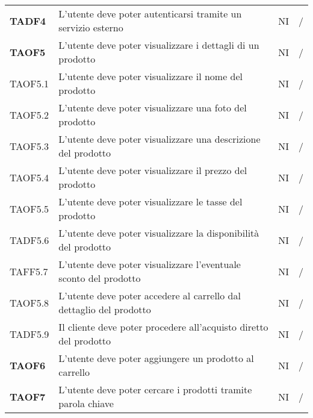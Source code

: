 \begin{center}
\begin{longtable}[!h]{p{60px} p{240px} p{35px} p{35px}}
        \textbf{TADF4}  & L'utente deve poter autenticarsi tramite un servizio esterno                                        & NI             & /              \\
        \textbf{TAOF5}  & L'utente deve poter visualizzare i dettagli di un prodotto                                          & NI             & /              \\
        TAOF5.1         & L'utente deve poter visualizzare il nome del prodotto                                               & NI             & /              \\
        TAOF5.2         & L'utente deve poter visualizzare una foto del prodotto                                              & NI             & /              \\
        TAOF5.3         & L'utente deve poter visualizzare una descrizione del prodotto                                       & NI             & /              \\
        TAOF5.4         & L'utente deve poter visualizzare il prezzo del prodotto                                             & NI             & /              \\
        TAOF5.5         & L'utente deve poter visualizzare le tasse del prodotto                                              & NI             & /              \\
        TADF5.6         & L'utente deve poter visualizzare la disponibilità del prodotto                                      & NI             & /              \\
        TAFF5.7         & L'utente deve poter visualizzare l'eventuale sconto del prodotto                                    & NI             & /              \\
        TAOF5.8         & L'utente deve poter accedere al carrello dal dettaglio del prodotto                                 & NI             & /              \\
        TADF5.9         & Il cliente deve poter procedere all'acquisto diretto del prodotto                                   & NI             & /              \\
        \textbf{TAOF6}  & L'utente deve poter aggiungere un prodotto al carrello                                              & NI             & /              \\
        \textbf{TAOF7}  & L'utente deve poter cercare i prodotti tramite parola chiave                                        & NI             & /              \\

\end{longtable}
\end{center}
